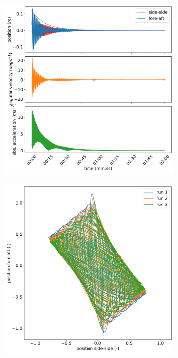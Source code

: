 \documentclass{article}
\begin{document}
\begin{figure}[ht!]

    \centering
    \begin{subfigure}[b]{0.45\textwidth}
        \centering
        \includegraphics[width=\textwidth]{../results/experiment/low_mass_acceleration.png}
    \end{subfigure}
    \begin{subfigure}[b]{0.45\textwidth}
        \centering
        \includegraphics[width=\textwidth]{../results/experiment/low_mass_orbit.png}
    \end{subfigure}
    

\end{figure}
\end{document}
